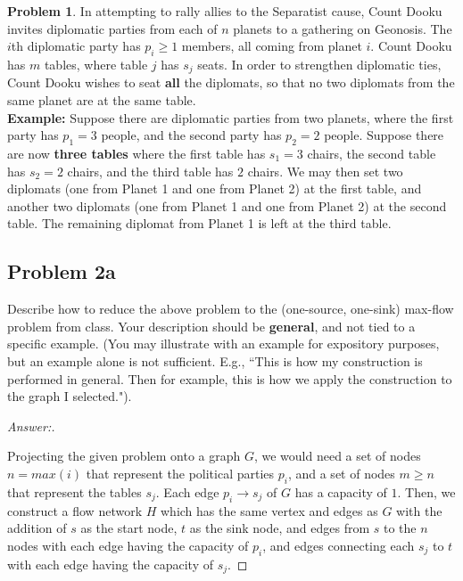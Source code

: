 \documentclass[11pt]{article}
\theoremstyle{definition}
\theoremstyle{definition}
\newtheorem{required}{Problem}
\theoremstyle{definition}
\begin{document}
\begin{required} \label{Problem2}
In attempting to rally allies to the Separatist cause, Count Dooku invites diplomatic parties from each of $n$ planets to a gathering on Geonosis. The $i$th diplomatic party has $p_{i} \geq 1$ members, all coming from planet $i$. Count Dooku has $m$ tables, where table $j$ has $s_{j}$ seats. In order to strengthen diplomatic ties, Count Dooku wishes to seat \textbf{all} the diplomats, so that no two diplomats from the same planet are at the same table. \\

\noindent \textbf{Example:} Suppose there are diplomatic parties from two planets, where the first party has $p_{1} = 3$ people, and the second party has $p_{2} = 2$ people. Suppose there are now \textbf{three tables} where the first table has $s_{1} = 3$ chairs, the second table has $s_{2} = 2$ chairs, and the third table has $2$ chairs. We may then set two diplomats (one from Planet 1 and one from Planet 2) at the first table, and another two diplomats (one from Planet 1 and one from Planet 2) at the second table. The remaining diplomat from Planet 1 is left at the third table.


\begin{enumerate}[label=(\alph*)]
\subsection{Problem 2a}
\item \label{2a} Describe how to reduce the above problem to the (one-source, one-sink) max-flow problem from class. Your description should be \textbf{general}, and not tied to a specific example. (You may illustrate with an example for expository purposes, but an example alone is not sufficient. E.g., ``This is how my construction is performed in general. Then for example, this is how we apply the construction to the graph I selected."). \\

\begin{proof}[Answer:] \
\item Projecting the given problem onto a graph $G$, we would need a set of nodes $n = max(i)$ that represent the political parties $p_i$, and a set of nodes $m \geq n$ that represent the tables $s_j$. Each edge $p_i \to s_j$ of $G$ has a capacity of $1$. Then, we construct a flow network $H$ which has the same vertex and edges as $G$ with the addition of $s$ as the start node, $t$ as the sink node, and edges from $s$ to the $n$ nodes with each edge having the capacity of $p_i$, and edges connecting each $s_j$ to $t$ with each edge having the capacity of $s_j$.
\end{proof}



\end{enumerate}
\end{required}
\end{document}
